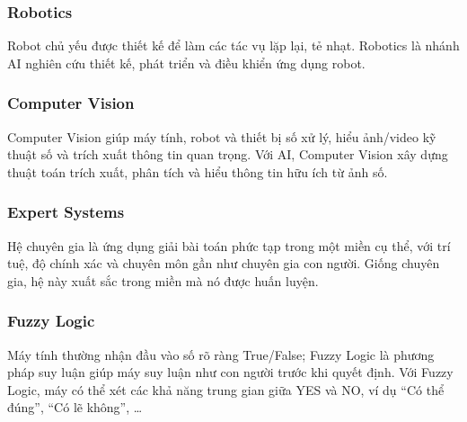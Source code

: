 \begin{vidu}[title={Tổng quan quan hệ AI--ML}]
\end{vidu}

\subsubsection{Robotics}

\begin{ynghia}[title={Robotics}]
Robot chủ yếu được thiết kế để làm các tác vụ lặp lại, tẻ nhạt.
Robotics là nhánh AI nghiên cứu thiết kế, phát triển và điều khiển ứng dụng robot.
\end{ynghia}

\subsubsection{Computer Vision}

\begin{ynghia}[title={Computer Vision}]
Computer Vision giúp máy tính, robot và thiết bị số xử lý, hiểu ảnh/video kỹ thuật số và trích xuất thông tin quan trọng.
Với AI, Computer Vision xây dựng thuật toán trích xuất, phân tích và hiểu thông tin hữu ích từ ảnh số.
\end{ynghia}

\subsubsection{Expert Systems}

\begin{ynghia}[title={Expert Systems}]
Hệ chuyên gia là ứng dụng giải bài toán phức tạp trong một miền cụ thể, với trí tuệ, độ chính xác và chuyên môn gần như chuyên gia con người.
Giống chuyên gia, hệ này xuất sắc trong miền mà nó được huấn luyện.
\end{ynghia}

\subsubsection{Fuzzy Logic}

\begin{ynghia}[title={Fuzzy Logic}]
Máy tính thường nhận đầu vào số rõ ràng True/False; Fuzzy Logic là phương pháp suy luận giúp máy suy luận như con người trước khi quyết định.
Với Fuzzy Logic, máy có thể xét các khả năng trung gian giữa YES và NO, ví dụ ``Có thể đúng'', ``Có lẽ không'', \ldots
\end{ynghia}

